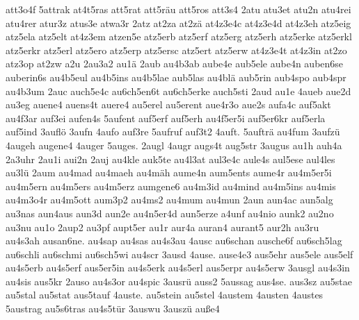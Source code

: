 {    att3o4f
    5attrak
    at4t5ras
    att5rat
    att5räu
    att5ros
    att3s4
    2atu
    atu3et
    atu2n
    atu4rei
    atu4rer
    atur3z
    atus3e
    atwa3r
    2atz
    at2za
    at2zä
    at4z3e4c
    at4z3e4d
    at4z3eh
    atz5eig
    atz5ela
    atz5elt
    at4z3em
    atzen5e
    atz5erb
    atz5erf
    atz5erg
    atz5erh
    atz5erke
    atz5erkl
    atz5erkr
    atz5erl
    atz5ero
    atz5erp
    atz5ersc
    atz5ert
    atz5erw
    at4z3e4t
    at4z3in
    at2zo
    atz3op
    at2zw
    a2u
    2au3a2
    au1ä
    2aub
    au4b3ab
    aube4e
    aub5ele
    aube4n
    auben6se
    auberin6s
    au4b5eul
    au4b5ins
    au4b5lae
    aub5las
    au4blä
    aub5rin
    aub4spo
    aub4spr
    au4b3um
    2auc
    auch5e4c
    au6ch5en6t
    au6ch5erke
    auch5sti
    2aud
    au1e
    4aueb
    aue2d
    au3eg
    auene4
    auens4t
    auere4
    au5erel
    au5erent
    aue4r3o
    aue2s
    aufa4c
    auf5akt
    au4f3ar
    auf3ei
    aufen4s
    5aufent
    auf5erf
    auf5erh
    au4f5er5i
    auf5er6kr
    auf5erla
    auf5ind
    3auflö
    3aufn
    4aufo
    auf3re
    5aufruf
    auf3t2
    4auft.
    5aufträ
    au4fum
    3aufzü
    4augeh
    augene4
    4auger
    5auges.
    2augl
    4augr
    augs4t
    aug5str
    3augus
    au1h
    auh4a
    2a3uhr
    2au1i
    aui2n
    2auj
    au4kle
    auk5te
    au4l3at
    aul3e4c
    aule4s
    aul5ese
    aul4les
    au3lü
    2aum
    au4mad
    au4maeh
    au4mäh
    aume4n
    aum5ents
    aume4r
    au4m5er5i
    au4m5ern
    au4m5ers
    au4m5erz
    aumgene6
    au4m3id
    au4mind
    au4m5ins
    au4mis
    au4m3o4r
    au4m5ott
    aum3p2
    au4ms2
    au4mum
    au4mun
    2aun
    aun4ac
    aun5alg
    au3nas
    aun4aus
    aun3d
    aun2e
    au4n5er4d
    aun5erze
    a4unf
    au4nio
    aunk2
    au2no
    au3nu
    au1o
    2aup2
    au3pf
    aupt5er
    au1r
    aur4a
    auran4
    aurant5
    aur2h
    au3ru
    au4s3ah
    ausan6ne.
    au4sap
    au4sas
    au4s3au
    4ausc
    au6schan
    ausche6f
    au6sch5lag
    au6schli
    au6schmi
    au6sch5wi
    au4scr
    3ausd
    4ause.
    ause4e3
    aus5ehr
    aus5ele
    aus5elf
    au4s5erb
    au4s5erf
    aus5er5in
    au4s5erk
    au4s5erl
    aus5erpr
    au4s5erw
    3ausgl
    au4s3in
    au4sis
    aus5kr
    2auso
    au4s3or
    au4spic
    3ausrü
    auss2
    5aussag
    aus4se.
    aus3sz
    au5stae
    au5stal
    au5stat
    aus5tauf
    4auste.
    au5stein
    au5stel
    4austem
    4austen
    4austes
    5austrag
    au5s6tras
    au4s5tür
    3auswu
    3auszü
    auße4
}
